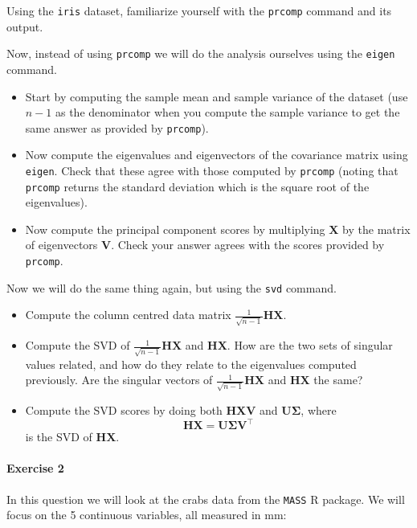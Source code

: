 \documentclass[
]{book}
\providecommand{\tightlist}{%
  \setlength{\itemsep}{0pt}\setlength{\parskip}{0pt}}
\theoremstyle{definition}
\theoremstyle{definition}
\theoremstyle{definition}
\theoremstyle{definition}
\theoremstyle{remark}
\begin{document}
Using the \texttt{iris} dataset, familiarize yourself with the \texttt{prcomp} command and its output.

Now, instead of using \texttt{prcomp} we will do the analysis ourselves using the \texttt{eigen} command.

\begin{itemize}
\tightlist
\item
  Start by computing the sample mean and sample variance of the dataset (use \(n-1\) as the denominator when you compute the sample variance to get the same answer as provided by \texttt{prcomp}).
\item
  Now compute the eigenvalues and eigenvectors of the covariance matrix using \texttt{eigen}. Check that these agree with those computed by \texttt{prcomp} (noting that \texttt{prcomp} returns the standard deviation which is the square root of the eigenvalues).
\item
  Now compute the principal component scores by multiplying \(\mathbf X\) by the matrix of eigenvectors \(\mathbf V\). Check your answer agrees with the scores provided by \texttt{prcomp}.
\end{itemize}

Now we will do the same thing again, but using the \texttt{svd} command.

\begin{itemize}
\item
  Compute the column centred data matrix \(\frac{1}{\sqrt{n-1}}\mathbf H\mathbf X\).
\item
  Compute the SVD of \(\frac{1}{\sqrt{n-1}}\mathbf H\mathbf X\) and \(\mathbf H\mathbf X\). How are the two sets of singular values related, and how do they relate to the eigenvalues computed previously.
  Are the singular vectors of \(\frac{1}{\sqrt{n-1}}\mathbf H\mathbf X\) and \(\mathbf H\mathbf X\) the same?
\item
  Compute the SVD scores by doing both \(\mathbf H\mathbf X\mathbf V\) and \(\mathbf U\boldsymbol{\Sigma}\), where
  \[\mathbf H\mathbf X= \mathbf U\boldsymbol{\Sigma}\mathbf V^\top\]
  is the SVD of \(\mathbf H\mathbf X\).
\end{itemize}

\paragraph*{Exercise 2}\label{exercise-2}

In this question we will look at the crabs data from the \texttt{MASS} R package.
We will focus on the 5 continuous variables, all measured in mm:
\end{document}
